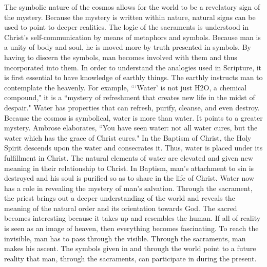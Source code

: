 \documentclass[twoside,10pt]{article}
\begin{document}
The symbolic nature of the cosmos allows for the world to be a revelatory sign of the mystery. Because the mystery is written within nature, natural signs can be used to point to deeper realities. The logic of the sacraments is understood in Christ’s self-communication by means of metaphors and symbols. Because man is a unity of body and soul, he is moved more by truth presented in symbols. By having to discern the symbols, man becomes involved with them and thus incorporated into them. In order to understand the analogies used in Scripture, it is first essential to have knowledge of earthly things.\autocite[Cf.][219-220, In order to understand the parable of the mustard seed, one must have knowledge of the reality of the seed itself. Origen writes that the ``nature of the seed is such that, though it is the least of all seeds…it nevertheless becomes greater than all herbs." The natural understanding of the mustard seed is used to describe the perfection of faith and the growth of the kingdom of heaven. These analogies are possible because of the nature of the mustard seed itself.]{origen} The earthly instructs man to contemplate the heavenly. For example, ``‘Water’ is not just H2O, a chemical compound," it is a ``mystery of refreshment that creates new life in the midst of despair."\autocite[161]{rat2} Water has properties that can refresh, purify, cleanse, and even destroy. Because the cosmos is symbolical, water is more than water. It points to a greater mystery. Ambrose elaborates, ``You have seen water: not all water cures, but the water which has the grace of Christ cures."\autocite[274]{ambrose} In the Baptism of Christ, the Holy Spirit descends upon the water and consecrates it. Thus, water is placed under its fulfillment in Christ. The natural elements of water are elevated and given new meaning in their relationship to Christ. In Baptism, man’s attachment to sin is destroyed and his soul is purified so as to share in the life of Christ. Water now has a role in revealing the mystery of man’s salvation. Through the sacrament, the priest brings out a deeper understanding of the world and reveals the meaning of the natural order and its orientation towards God. The sacred becomes interesting because it takes up and resembles the human. If all of reality is seen as an image of heaven, then everything becomes fascinating. To reach the invisible, man has to pass through the visible. Through the sacraments, man makes his ascent. The symbols given in and through the world point to a future reality that man, through the sacraments, can participate in during the present. 
\end{document}
